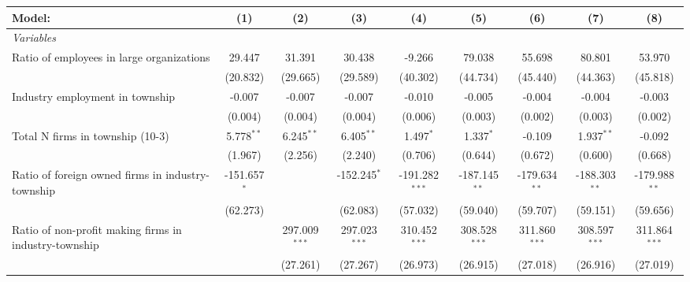 \begingroup
\centering
\begin{tabular}{lcccccccc}
   \tabularnewline \midrule \midrule
   Model:                                                & (1)            & (2)             & (3)             & (4)              & (5)             & (6)             & (7)             & (8)\\  
   \midrule
   \emph{Variables}\\
   Ratio of employees in large organizations             & 29.447         & 31.391          & 30.438          & -9.266           & 79.038          & 55.698          & 80.801          & 53.970\\   
                                                         & (20.832)       & (29.665)        & (29.589)        & (40.302)         & (44.734)        & (45.440)        & (44.363)        & (45.818)\\   
   Industry employment in township                       & -0.007         & -0.007          & -0.007          & -0.010           & -0.005          & -0.004          & -0.004          & -0.003\\   
                                                         & (0.004)        & (0.004)         & (0.004)         & (0.006)          & (0.003)         & (0.002)         & (0.003)         & (0.002)\\   
   Total N firms in township (10-3)                      & 5.778$^{**}$   & 6.245$^{**}$    & 6.405$^{**}$    & 1.497$^{*}$      & 1.337$^{*}$     & -0.109          & 1.937$^{**}$    & -0.092\\   
                                                         & (1.967)        & (2.256)         & (2.240)         & (0.706)          & (0.644)         & (0.672)         & (0.600)         & (0.668)\\   
   Ratio of foreign owned firms in industry-township     & -151.657$^{*}$ &                 & -152.245$^{*}$  & -191.282$^{***}$ & -187.145$^{**}$ & -179.634$^{**}$ & -188.303$^{**}$ & -179.988$^{**}$\\   
                                                         & (62.273)       &                 & (62.083)        & (57.032)         & (59.040)        & (59.707)        & (59.151)        & (59.656)\\   
   Ratio of non-profit making firms in industry-township &                & 297.009$^{***}$ & 297.023$^{***}$ & 310.452$^{***}$  & 308.528$^{***}$ & 311.860$^{***}$ & 308.597$^{***}$ & 311.864$^{***}$\\   
                                                         &                & (27.261)        & (27.267)        & (26.973)         & (26.915)        & (27.018)        & (26.916)        & (27.019)\\   

\end{tabular}
